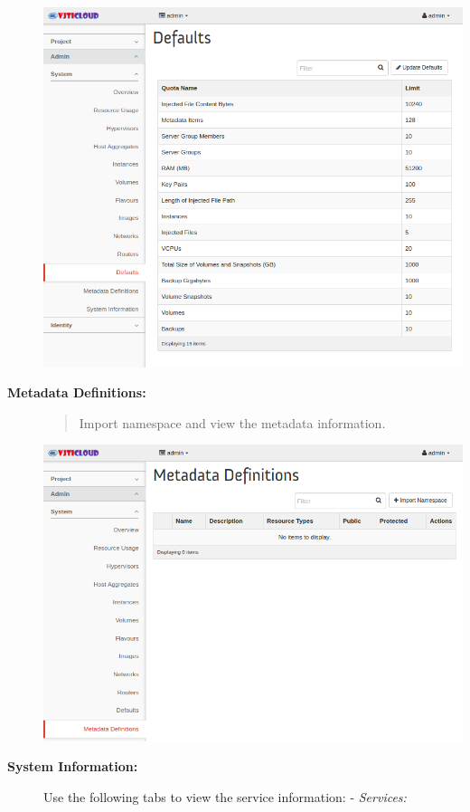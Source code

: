 \documentclass[letterpaper,10pt,english]{sphinxmanual}
\begin{document}
\begin{description}
\includegraphics{sys_defaults.png}

\item[{\textbf{Metadata Definitions:}}] \leavevmode\begin{quote}

Import namespace and view the metadata information.
\end{quote}

\includegraphics{sys_metadata_definitions.png}

\item[{\textbf{System Information:}}] \leavevmode
Use the following tabs to view the service information:
- \emph{Services:}
\begin{quote}
\begin{quote}


\end{quote}
\end{quote}
\end{description}
\end{document}
